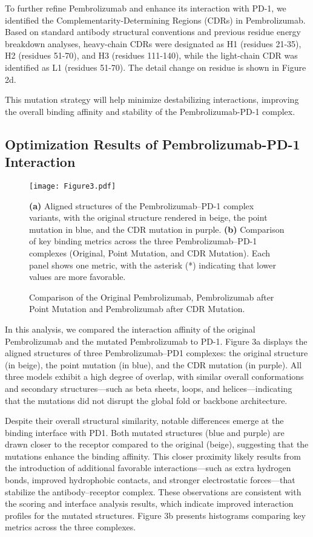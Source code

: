 \documentclass[11pt]{article}
\begin{document}
To further refine Pembrolizumab and enhance its interaction with PD-1, we identified the Complementarity-Determining Regions (CDRs) in Pembrolizumab. Based on standard antibody structural conventions and previous residue energy breakdown analyses, heavy-chain CDRs were designated as H1 (residues 21-35), H2 (residues 51-70), and H3 (residues 111-140), while the light-chain CDR was identified as L1 (residues 51-70). The detail change on residue is shown in Figure 2d.

This mutation strategy will help minimize destabilizing interactions, improving the overall binding affinity and stability of the Pembrolizumab-PD-1 complex.

\subsection{Optimization Results of Pembrolizumab-PD-1 Interaction}

\begin{figure}[t]
\begin{center}
\texttt{[image: Figure3.pdf]}
\end{center}
\caption{Comparison of the Original Pembrolizumab, Pembrolizumab after Point Mutation and Pembrolizumab after CDR Mutation.}
\textbf{(a)} Aligned structures of the Pembrolizumab–PD-1 complex variants, with the original structure rendered in beige, the point mutation in blue, and the CDR mutation in purple.
\textbf{(b)} Comparison of key binding metrics across the three Pembrolizumab–PD-1 complexes (Original, Point Mutation, and CDR Mutation). Each panel shows one metric, with the asterisk (*) indicating that lower values are more favorable.  
\label{fig:fig3}
\end{figure}

In this analysis, we compared the interaction affinity of the original Pembrolizumab and the mutated Pembrolizumab to PD-1. Figure 3a displays the aligned structures of three Pembrolizumab–PD1 complexes: the original structure (in beige), the point mutation (in blue), and the CDR mutation (in purple). All three models exhibit a high degree of overlap, with similar overall conformations and secondary structures—such as beta sheets, loops, and helices—indicating that the mutations did not disrupt the global fold or backbone architecture.

Despite their overall structural similarity, notable differences emerge at the binding interface with PD1. Both mutated structures (blue and purple) are drawn closer to the receptor compared to the original (beige), suggesting that the mutations enhance the binding affinity. This closer proximity likely results from the introduction of additional favorable interactions—such as extra hydrogen bonds, improved hydrophobic contacts, and stronger electrostatic forces—that stabilize the antibody–receptor complex. These observations are consistent with the scoring and interface analysis results, which indicate improved interaction profiles for the mutated structures. Figure 3b presents histograms comparing key metrics across the three complexes.
\end{document}
